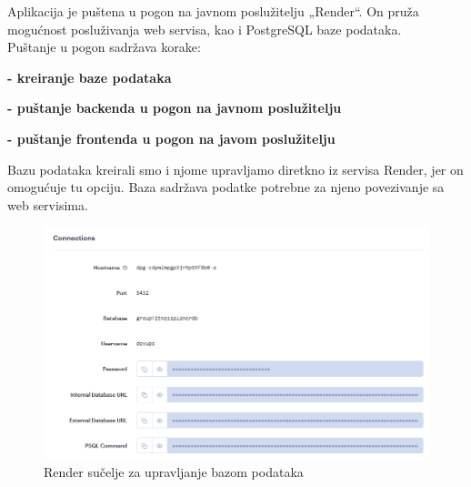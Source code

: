            {Aplikacija je puštena u pogon na javnom poslužitelju „Render“. On pruža mogućnost posluživanja web servisa, kao i PostgreSQL baze podataka.\\
            Puštanje u pogon sadržava korake:
            \item \textbf{- kreiranje baze podataka}
            \item \textbf{- puštanje backenda u pogon na javnom poslužitelju}
            \item \textbf{- puštanje frontenda u pogon na javom poslužitelju\\}

            {Bazu podataka kreirali smo i njome upravljamo diretkno iz servisa Render, jer on omogućuje tu opciju. Baza sadržava podatke potrebne za njeno povezivanje sa web servisima. }
            \begin{figure}[H]
                      \includegraphics[scale=0.5]{./Slike/baza.png}
                      \centering
                      \caption{Render sučelje za upravljanje bazom podataka}
                      \label{fig:promjene}
                \end{figure}

}
